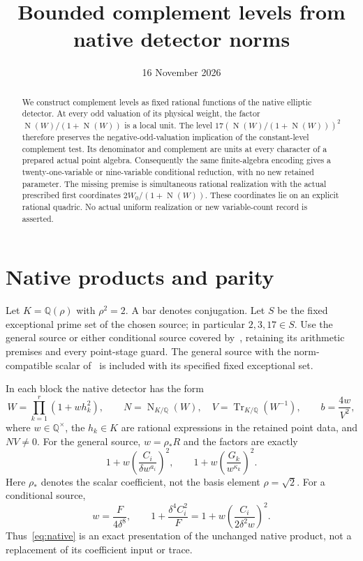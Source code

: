 \documentclass[11pt,a4paper]{article}
\title{Bounded complement levels from native detector norms}
\author{}\date{16 November 2026}
\newcommand{\Q}{\mathbb Q}\newcommand{\Z}{\mathbb Z}
\DeclareMathOperator{\Tr}{Tr}\DeclareMathOperator{\N}{N}
\begin{document}
\maketitle
\begin{abstract}
We construct complement levels as fixed rational functions of the native
elliptic detector. At every odd valuation of its physical weight, the
factor $\N(W)/(1+\N(W))$ is a local unit. The level
$17(\N(W)/(1+\N(W)))^2$ therefore preserves the negative-odd-valuation
implication of the constant-level complement test. Its denominator
and complement are units at every character of a prepared actual point
algebra. Consequently the same finite-algebra encoding gives a
twenty-one-variable or nine-variable conditional reduction, with no
new retained parameter. The missing premise is simultaneous rational
realization with the actual prescribed first coordinates
$2W_0/(1+\N(W))$. These coordinates lie on an explicit rational quadric.
No actual uniform realization or new variable-count record is asserted.
\end{abstract}

\section{Native products and parity}

Let $K=\Q(\rho)$ with $\rho^2=2$. A bar denotes conjugation.
Let $S$ be the fixed exceptional prime set of the chosen source;
in particular $2,3,17\in S$. Use the general source or either
conditional source covered by~\cite{Complements}, retaining its
arithmetic premises and every point-stage guard.
The general source with the norm-compatible scalar of~\cite{NormPreparation}
is included with its specified fixed exceptional set.

In each block the native detector has the form
\begin{equation}\label{eq:native}
 W=\prod_{k=1}^r(1+w h_k^2),\qquad
 N=\N_{K/\Q}(W),\quad V=\Tr_{K/\Q}(W^{-1}),\qquad
 b=\frac{4w}{V^2},
\end{equation}
where $w\in\Q^\times$, the $h_k\in K$ are rational expressions in
the retained point data, and $NV\ne0$.
For the general source, $w=\rho_*R$ and the factors are exactly
\[
 1+w\left(\frac{C_i}{\delta w^{a_i}}\right)^2,
 \qquad
 1+w\left(\frac{G_k}{w^{\kappa_k}}\right)^2.
\]
Here $\rho_*$ denotes the scalar coefficient, not the basis element
$\rho=\sqrt2$.
For a conditional source,
\[
 w=\frac{F}{4\delta^8},\qquad
 1+\frac{\delta^4C_i^2}{F}
 =1+w\left(\frac{C_i}{2\delta^2w}\right)^2.
\]
Thus~\eqref{eq:native} is an exact presentation of the unchanged
native product, not a replacement of its coefficient input or trace.
\end{document}
